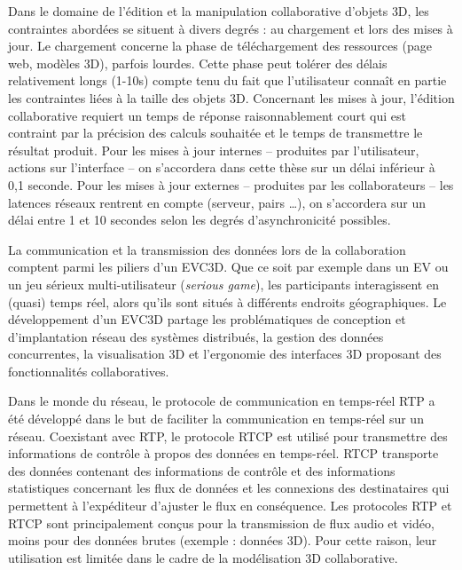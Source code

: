 Dans le domaine de l'édition et la manipulation collaborative 
d'objets \gls{3D}, les contraintes abordées se situent à divers degrés : au 
chargement 
et lors des mises à jour. Le chargement concerne la phase de téléchargement des 
ressources (page web, modèles \gls{3D}), parfois lourdes. Cette phase peut tolérer 
des délais relativement longs (1-10s) compte tenu du fait que l'utilisateur 
connaît en partie les contraintes liées à la taille des objets \gls{3D}. 
Concernant les mises à jour, l'édition collaborative requiert un temps de réponse 
raisonnablement court qui est contraint par la précision des calculs souhaitée 
et le temps de transmettre le résultat produit. Pour les 
mises à jour internes -- produites par l'utilisateur, actions sur l'interface -- on 
s'accordera dans cette thèse sur un délai inférieur à 0,1 seconde. 
Pour les mises à jour externes -- produites par les collaborateurs -- les latences 
réseaux rentrent en compte (serveur, pairs \dots), on s'accordera sur un délai 
entre 1 et 10 secondes selon les degrés d'asynchronicité possibles. 





La communication et la transmission des données lors de la collaboration 
comptent parmi les piliers d'un \gls{EVC3D}. Que ce soit par exemple 
dans un \gls{EV} ou un jeu sérieux multi-utilisateur (\textit{serious game}), les 
participants interagissent en (quasi) temps réel, alors qu'ils sont situés à 
différents endroits géographiques. 
Le développement d'un \gls{EVC3D} partage les problématiques de conception 
et d'implantation réseau des systèmes distribués, la gestion des données 
concurrentes, la visualisation 3D et l'ergonomie des interfaces 3D proposant 
des fonctionnalités collaboratives.

Dans le monde du réseau, le protocole de communication en temps-réel \gls{RTP} a 
été développé dans le but de faciliter la communication en temps-réel sur un 
réseau. Coexistant avec \gls{RTP}, le protocole \gls{RTCP} est utilisé pour 
transmettre des informations de contrôle à propos des données en temps-réel. 
\gls{RTCP} transporte des données contenant des informations de contrôle et des 
informations statistiques concernant les flux de données et les connexions des 
destinataires qui permettent à l'expéditeur d'ajuster le flux en conséquence. Les 
protocoles \gls{RTP} et \gls{RTCP} sont principalement conçus pour la 
transmission de flux audio et vidéo, moins pour des données brutes (exemple : données \gls{3D}).
Pour cette raison, leur utilisation est limitée dans le cadre 
de la modélisation \gls{3D} collaborative. 

